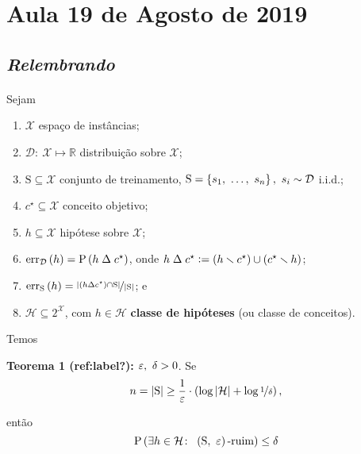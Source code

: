 \section{Aula 19 de Agosto de 2019}
\label{2019_08_19}

\subsection*{\it Relembrando}

\paragraph{\nopunct} Sejam
\begin{enumerate}
  \item $\mathcal{X}$ espaço de instâncias;
  \item $\mathcal{D}\colon\ \mathcal{X}\mapsto\mathds{R}$ distribuição sobre $\mathcal{X}$;
  \item $\mathrm{S}\subseteq\mathcal{X}$ conjunto de treinamento, 
  $\mathrm{S}=\left\{s_1,\ \ldots,\ s_n\vphantom{1j}\right\},\ s_i\sim\mathcal{D}$ i.i.d.;
  \item $c^\star\subseteq\mathcal{X}$ conceito objetivo;
  \item $h\subseteq\mathcal{X}$ hipótese sobre $\mathcal{X}$;
  \item $\mathrm{err}_\mathcal{D}\left(h\vphantom{1j}\right)=\mathrm{P}\left(h\mathrel{\Delta}c^\star\vphantom{1j}\right)$, onde 
  $h\mathrel{\Delta}c^\star\vcentcolon=\left(h\setminus c^\star\vphantom{1j}\right)\cup\left(c^\star\setminus h\vphantom{1j}\right)$;
  \item $\mathrm{err}_\mathrm{S}\left(h\vphantom{1j}\right)=
  \nicefrac{\left|\left(h\mathrel{\Delta}c^\star\vphantom{1j}\right)\cap\mathrm{S}\vphantom{1j}\right|}{\left|\mathrm{S}\vphantom{1j}\right|}$; e
  \item $\mathcal{H}\subseteq 2^\mathcal{X}$, com $h\in\mathcal{H}$ \textbf{classe de hipóteses} 
  (ou classe de conceitos).
\end{enumerate}

Temos

\textbf{Teorema 1 (ref:label?):} $\eps,\ \delta>0$. Se
\[
  n = \left|\mathrm{S}\vphantom{1j}\right| \geq \frac{1}{\eps}\cdot\left(\log\left|\mathcal{H}\vphantom{1j}\right| + \log\nicefrac{1}{\delta}\vphantom{1j}\right),
\]

então
\[
  \mathrm{P}\left(\exists h\in\mathcal{H}\colon\ \left(\mathrm{S},\ \eps\vphantom{1j}\right)\text{-ruim}\vphantom{1j}\right) \leq \delta
\]

